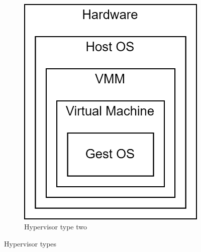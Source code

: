 \begin{figure}[H]
\begin{subfigure}{0.4\textwidth}
        \includegraphics[width=0.75\linewidth]{images/hyp2.png}
        \caption{Hypervisor type two}
    \end{subfigure}
    \caption{Hypervisor types}
\end{figure}

